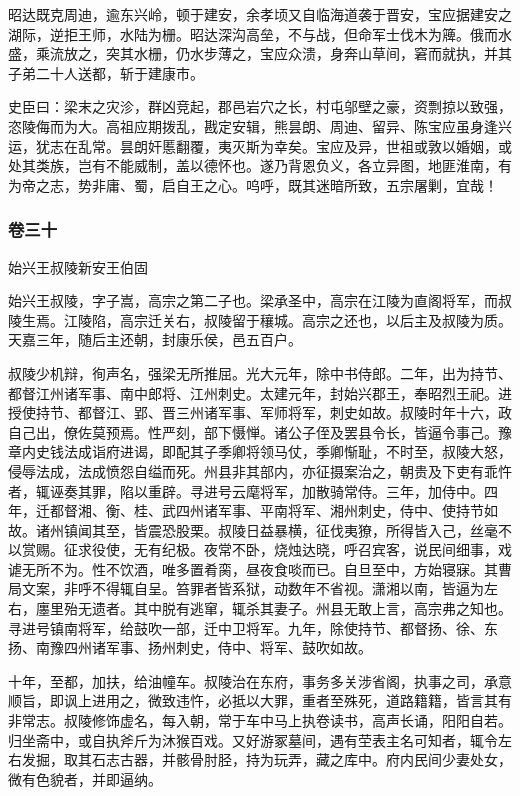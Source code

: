 \documentclass[]{article}
\begin{document}
昭达既克周迪，逾东兴岭，顿于建安，余孝顷又自临海道袭于晋安，宝应据建安之湖际，逆拒王师，水陆为栅。昭达深沟高垒，不与战，但命军士伐木为簰。俄而水盛，乘流放之，突其水栅，仍水步薄之，宝应众溃，身奔山草间，窘而就执，并其子弟二十人送都，斩于建康市。

史臣曰：梁末之灾沴，群凶竞起，郡邑岩穴之长，村屯邬壁之豪，资剽掠以致强，恣陵侮而为大。高祖应期拨乱，戡定安辑，熊昙朗、周迪、留异、陈宝应虽身逢兴运，犹志在乱常。昙朗奸慝翻覆，夷灭斯为幸矣。宝应及异，世祖或敦以婚姻，或处其类族，岂有不能威制，盖以德怀也。遂乃背恩负义，各立异图，地匪淮南，有为帝之志，势非庸、蜀，启自王之心。呜呼，既其迷暗所致，五宗屠剿，宜哉！

\hypertarget{header-n5193}{%
\subsubsection{卷三十}\label{header-n5193}}

始兴王叔陵新安王伯固

始兴王叔陵，字子嵩，高宗之第二子也。梁承圣中，高宗在江陵为直阁将军，而叔陵生焉。江陵陷，高宗迁关右，叔陵留于穰城。高宗之还也，以后主及叔陵为质。天嘉三年，随后主还朝，封康乐侯，邑五百户。

叔陵少机辩，徇声名，强梁无所推屈。光大元年，除中书侍郎。二年，出为持节、都督江州诸军事、南中郎将、江州刺史。太建元年，封始兴郡王，奉昭烈王祀。进授使持节、都督江、郢、晋三州诸军事、军师将军，刺史如故。叔陵时年十六，政自己出，僚佐莫预焉。性严刻，部下慑惮。诸公子侄及罢县令长，皆逼令事己。豫章内史钱法成诣府进谒，即配其子季卿将领马仗，季卿惭耻，不时至，叔陵大怒，侵辱法成，法成愤怨自缢而死。州县非其部内，亦征摄案治之，朝贵及下吏有乖忤者，辄诬奏其罪，陷以重辟。寻进号云麾将军，加散骑常侍。三年，加侍中。四年，迁都督湘、衡、桂、武四州诸军事、平南将军、湘州刺史，侍中、使持节如故。诸州镇闻其至，皆震恐股栗。叔陵日益暴横，征伐夷獠，所得皆入己，丝毫不以赏赐。征求役使，无有纪极。夜常不卧，烧烛达晓，呼召宾客，说民间细事，戏谑无所不为。性不饮酒，唯多置肴脔，昼夜食啖而已。自旦至中，方始寝寐。其曹局文案，非呼不得辄自呈。笞罪者皆系狱，动数年不省视。潇湘以南，皆逼为左右，廛里殆无遗者。其中脱有逃窜，辄杀其妻子。州县无敢上言，高宗弗之知也。寻进号镇南将军，给鼓吹一部，迁中卫将军。九年，除使持节、都督扬、徐、东扬、南豫四州诸军事、扬州刺史，侍中、将军、鼓吹如故。

十年，至都，加扶，给油幢车。叔陵治在东府，事务多关涉省阁，执事之司，承意顺旨，即讽上进用之，微致违忤，必抵以大罪，重者至殊死，道路籍籍，皆言其有非常志。叔陵修饰虚名，每入朝，常于车中马上执卷读书，高声长诵，阳阳自若。归坐斋中，或自执斧斤为沐猴百戏。又好游冢墓间，遇有茔表主名可知者，辄令左右发掘，取其石志古器，并骸骨肘胫，持为玩弄，藏之库中。府内民间少妻处女，微有色貌者，并即逼纳。
\end{document}
